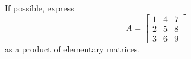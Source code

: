 \documentclass{ximera}
\begin{document}


\begin{problem}\label{prob:expressasprodelemmat} If possible, express 
$$A=\begin{bmatrix}1&4&7\\2&5&8\\3&6&9\end{bmatrix}$$
as a product of elementary matrices.
\end{problem}
\end{document}
